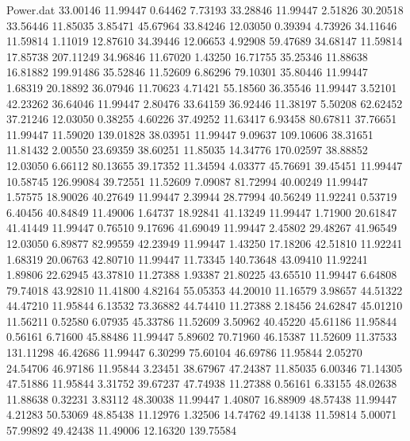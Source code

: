 \begin{filecontents}{Power.dat}
  33.00146   11.99447    0.64462    7.73193
  33.28846   11.99447    2.51826   30.20518
  33.56446   11.85035    3.85471   45.67964
  33.84246   12.03050    0.39394    4.73926
  34.11646   11.59814    1.11019   12.87610
  34.39446   12.06653    4.92908   59.47689
  34.68147   11.59814   17.85738  207.11249
  34.96846   11.67020    1.43250   16.71755
  35.25346   11.88638   16.81882  199.91486
  35.52846   11.52609    6.86296   79.10301
  35.80446   11.99447    1.68319   20.18892
  36.07946   11.70623    4.71421   55.18560
  36.35546   11.99447    3.52101   42.23262
  36.64046   11.99447    2.80476   33.64159
  36.92446   11.38197    5.50208   62.62452
  37.21246   12.03050    0.38255    4.60226
  37.49252   11.63417    6.93458   80.67811
  37.76651   11.99447   11.59020  139.01828
  38.03951   11.99447    9.09637  109.10606
  38.31651   11.81432    2.00550   23.69359
  38.60251   11.85035   14.34776  170.02597
  38.88852   12.03050    6.66112   80.13655
  39.17352   11.34594    4.03377   45.76691
  39.45451   11.99447   10.58745  126.99084
  39.72551   11.52609    7.09087   81.72994
  40.00249   11.99447    1.57575   18.90026
  40.27649   11.99447    2.39944   28.77994
  40.56249   11.92241    0.53719    6.40456
  40.84849   11.49006    1.64737   18.92841
  41.13249   11.99447    1.71900   20.61847
  41.41449   11.99447    0.76510    9.17696
  41.69049   11.99447    2.45802   29.48267
  41.96549   12.03050    6.89877   82.99559
  42.23949   11.99447    1.43250   17.18206
  42.51810   11.92241    1.68319   20.06763
  42.80710   11.99447   11.73345  140.73648
  43.09410   11.92241    1.89806   22.62945
  43.37810   11.27388    1.93387   21.80225
  43.65510   11.99447    6.64808   79.74018
  43.92810   11.41800    4.82164   55.05353
  44.20010   11.16579    3.98657   44.51322
  44.47210   11.95844    6.13532   73.36882
  44.74410   11.27388    2.18456   24.62847
  45.01210   11.56211    0.52580    6.07935
  45.33786   11.52609    3.50962   40.45220
  45.61186   11.95844    0.56161    6.71600
  45.88486   11.99447    5.89602   70.71960
  46.15387   11.52609   11.37533  131.11298
  46.42686   11.99447    6.30299   75.60104
  46.69786   11.95844    2.05270   24.54706
  46.97186   11.95844    3.23451   38.67967
  47.24387   11.85035    6.00346   71.14305
  47.51886   11.95844    3.31752   39.67237
  47.74938   11.27388    0.56161    6.33155
  48.02638   11.88638    0.32231    3.83112
  48.30038   11.99447    1.40807   16.88909
  48.57438   11.99447    4.21283   50.53069
  48.85438   11.12976    1.32506   14.74762
  49.14138   11.59814    5.00071   57.99892
  49.42438   11.49006   12.16320  139.75584

\end{filecontents}

